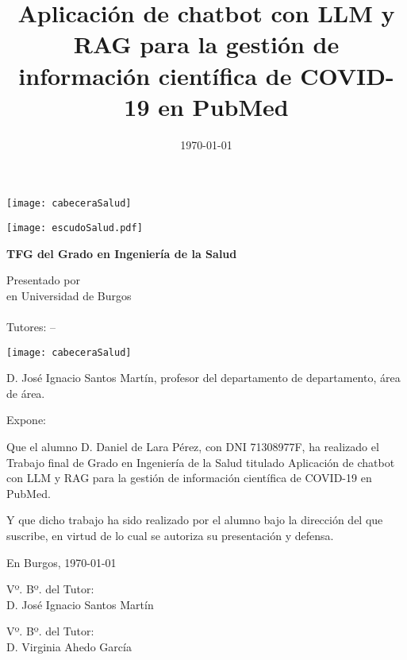 \documentclass[a4paper,12pt,twoside]{memoir}
\title{Aplicación de chatbot con LLM y RAG para la gestión de 
información científica de COVID-19 en PubMed}
\author{\nombre}
\date{\today}
\makeatletter
\def\maketitle{
  \null
  \thispagestyle{empty}
\begin{center}
  \noindent\texttt{[image: cabeceraSalud]}\vspace{1.5cm}%
\end{center}
  
  \begin{center}
    \begin{minipage}[c][1.5cm][c]{.20\textwidth}
        \texttt{[image: escudoSalud.pdf]}
    \end{minipage}
  \end{center}
  
  \begin{center}
    \colorbox{cpardoBox}{%
        \begin{minipage}{.8\textwidth}
          \vspace{.5cm}\Large
          \begin{center}
          \textbf{TFG del Grado en Ingeniería de la Salud}\vspace{.6cm}\\
          \textbf{\LARGE\@title{}}
          \end{center}
          \vspace{.2cm}
        \end{minipage}
    }%
  \end{center}
  
  \begin{center}%
  {%
    \noindent\LARGE
    Presentado por \@author{}\\ 
    en Universidad de Burgos\\
    \vspace{0.5cm}
    \noindent\Large
    \@date{}\\
    \vspace{0.5cm}
    Tutores: \@tutor{} -- \@tutorb{}\\
  }%
  \end{center}%
  \null
  \cleardoublepage
  }
\newcommand{\nombre}{Daniel de Lara Pérez}
\newcommand{\nombreTutor}{José Ignacio Santos Martín}
\newcommand{\nombreTutorb}{Virginia Ahedo García}
\newcommand{\dni}{71308977F}
\makeatother
\begin{document}
\maketitle


\newpage\null\thispagestyle{empty}\newpage

\thispagestyle{empty}


\noindent\texttt{[image: cabeceraSalud]}\vspace{1cm}

\noindent D. \nombreTutor, profesor del departamento de departamento, área de área.

\noindent Expone:

\noindent Que el alumno D. \nombre, con DNI \dni, ha realizado el Trabajo final de Grado en Ingeniería de la Salud titulado Aplicación de chatbot con LLM y RAG para la gestión de 
información científica de COVID-19 en PubMed. 

\noindent Y que dicho trabajo ha sido realizado por el alumno bajo la dirección del que suscribe, en virtud de lo cual se autoriza su presentación y defensa.

\begin{center} %
En Burgos, {\large \today}
\end{center}

\vfill\vfill\vfill

\begin{minipage}{0.45\textwidth}
\begin{flushleft} %
Vº. Bº. del Tutor:\\[2cm]
D. \nombreTutor
\end{flushleft}
\end{minipage}
\hfill
\begin{minipage}{0.45\textwidth}
\begin{flushleft} %
Vº. Bº. del Tutor:\\[2cm]
D. \nombreTutorb
\end{flushleft}
\end{minipage}
\hfill

\vfill



\newpage\null\thispagestyle{empty}\newpage
\end{document}

